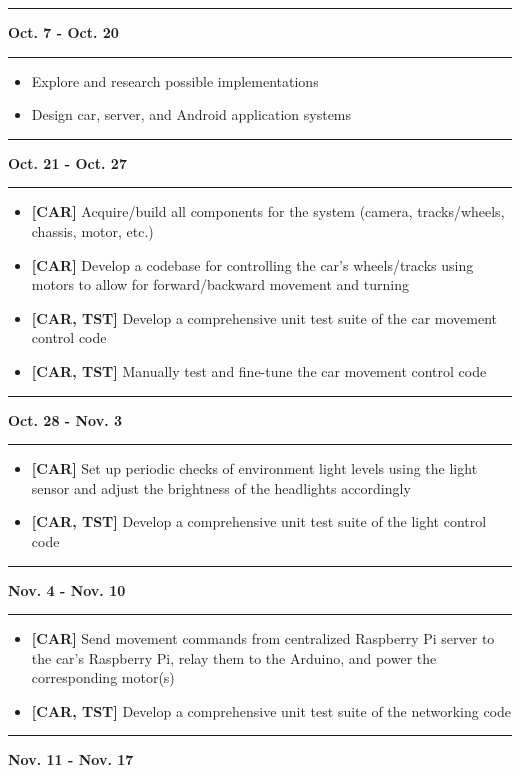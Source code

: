 \documentclass[letterpaper,12pt]{report}
\begin{document}
	\noindent\rule[0.5em]{\textwidth}{0.5pt}
	\textbf{Oct. 7 - Oct. 20}\\
	\noindent\rule{\textwidth}{0.5pt}
	\begin{itemize}
		\item Explore and research possible implementations
		\item Design car, server, and Android application systems
	\end{itemize}
	\noindent\rule[0.5em]{\textwidth}{0.5pt}
	\textbf{Oct. 21 - Oct. 27}\\
	\noindent\rule{\textwidth}{0.5pt}
	\begin{itemize}
		\item \textbf{[CAR]} Acquire/build all components for the system
			(camera, tracks/wheels, chassis, motor, etc.)
		\item \textbf{[CAR]} Develop a codebase for controlling the car’s
			wheels/tracks using motors to allow for forward/backward movement
			and turning
		\item \textbf{[CAR, TST]} Develop a comprehensive unit test suite of the
			car movement control code
		\item \textbf{[CAR, TST]} Manually test and fine-tune the car movement
			control code
	\end{itemize}
	\noindent\rule[0.5em]{\textwidth}{0.5pt}
	\textbf{Oct. 28 - Nov. 3}\\
	\noindent\rule{\textwidth}{0.5pt}
	\begin{itemize}
		\item \textbf{[CAR]} Set up periodic checks of environment light levels
			using the light sensor and adjust the brightness of the headlights
			accordingly
		\item \textbf{[CAR, TST]} Develop a comprehensive unit test suite of the
			light control code
	\end{itemize}
	\noindent\rule[0.5em]{\textwidth}{0.5pt}
	\textbf{Nov. 4 - Nov. 10}\\
	\noindent\rule{\textwidth}{0.5pt}
	\begin{itemize}
		\item \textbf{[CAR]} Send movement commands from centralized Raspberry
			Pi server to the car’s Raspberry Pi, relay them to the Arduino, and
			power the corresponding motor(s)
		\item \textbf{[CAR, TST]} Develop a comprehensive unit test suite of the
			networking code
	\end{itemize}
	\noindent\rule[0.5em]{\textwidth}{0.5pt}
	\textbf{Nov. 11 - Nov. 17}\\
\end{document}
